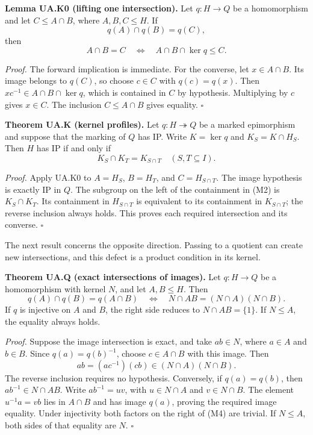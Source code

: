\documentclass[
  11pt,
  a4paper,
]{article}
\begin{document}
\textbf{Lemma UA.K0 (lifting one intersection).} Let \(q:H\to Q\) be a
homomorphism and let \(C\leq A\cap B\), where \(A,B,C\leq H\). If \[
q(A)\cap q(B)=q(C),
\] then \[
A\cap B=C\quad\Longleftrightarrow\quad A\cap B\cap\ker q\leq C.
\tag{M2}
\]

\emph{Proof.} The forward implication is immediate. For the converse,
let \(x\in A\cap B\). Its image belongs to \(q(C)\), so choose
\(c\in C\) with \(q(c)=q(x)\). Then \(xc^{-1}\in A\cap B\cap\ker q\),
which is contained in \(C\) by hypothesis. Multiplying by \(c\) gives
\(x\in C\). The inclusion \(C\leq A\cap B\) gives equality. \(\square\)

\textbf{Theorem UA.K (kernel profiles).} Let \(q:H\twoheadrightarrow Q\)
be a marked epimorphism and suppose that the marking of \(Q\) has IP.
Write \(K=\ker q\) and \(K_S=K\cap H_S\). Then \(H\) has IP if and only
if \[
K_S\cap K_T=K_{S\cap T}\quad(S,T\subseteq I).
\tag{M3}
\]

\emph{Proof.} Apply UA.K0 to \(A=H_S\), \(B=H_T\), and
\(C=H_{S\cap T}\). The image hypothesis is exactly IP in \(Q\). The
subgroup on the left of the containment in (M2) is \(K_S\cap K_T\). Its
containment in \(H_{S\cap T}\) is equivalent to its containment in
\(K_{S\cap T}\); the reverse inclusion always holds. This proves each
required intersection and its converse. \(\square\)

The next result concerns the opposite direction. Passing to a quotient
can create new intersections, and this defect is a product condition in
its kernel.

\textbf{Theorem UA.Q (exact intersections of images).} Let \(q:H\to Q\)
be a homomorphism with kernel \(N\), and let \(A,B\leq H\). Then \[
q(A)\cap q(B)=q(A\cap B)
\quad\Longleftrightarrow\quad
N\cap AB=(N\cap A)(N\cap B).
\tag{M4}
\] If \(q\) is injective on \(A\) and \(B\), the right side reduces to
\(N\cap AB=\{1\}\). If \(N\leq A\), the equality always holds.

\emph{Proof.} Suppose the image intersection is exact, and take
\(ab\in N\), where \(a\in A\) and \(b\in B\). Since \(q(a)=q(b)^{-1}\),
choose \(c\in A\cap B\) with this image. Then \[
ab=(ac^{-1})(cb)\in(N\cap A)(N\cap B).
\] The reverse inclusion requires no hypothesis. Conversely, if
\(q(a)=q(b)\), then \(ab^{-1}\in N\cap AB\). Write \(ab^{-1}=uv\), with
\(u\in N\cap A\) and \(v\in N\cap B\). The element \(u^{-1}a=vb\) lies
in \(A\cap B\) and has image \(q(a)\), proving the required image
equality. Under injectivity both factors on the right of (M4) are
trivial. If \(N\leq A\), both sides of that equality are \(N\).
\(\square\)
\end{document}
